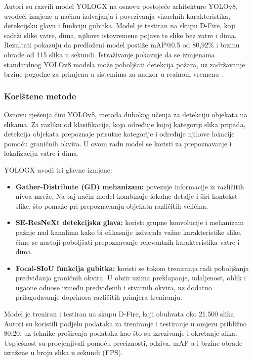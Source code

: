 Autori su razvili model YOLOGX na osnovu postojeće arhitekture YOLOv8, uvodeći izmjene u načinu izdvajanja i povezivanja vizuelnih karakteristika, detekcijsku glavu i funkciju gubitka. Model je testiran na skupu D-Fire, koji sadrži slike vatre, dima, njihove istovremene pojave te slike bez vatre i dima. Rezultati pokazuju da predloženi model postiže mAP@0.5 od 80,92\% i brzinu obrade od 115 slika u sekundi. Istraživanje pokazuje da se izmjenama standardnog YOLOv8 modela može poboljšati detekcija požara, uz zadržavanje brzine pogodne za primjenu u sistemima za nadzor u realnom vremenu \cite{liyologx}.

\subsubsection{Korištene metode}
Osnovu rješenja čini YOLOv8, metoda dubokog učenja za detekciju objekata na slikama. Za razliku od klasifikacije, koja određuje kojoj kategoriji slika pripada, detekcija objekata prepoznaje prisutne kategorije i određuje njihove lokacije pomoću graničnih okvira. U ovom radu model se koristi za prepoznavanje i lokalizaciju vatre i dima.

YOLOGX uvodi tri glavne izmjene:
\begin{itemize}
  \item \textbf{Gather-Distribute (GD) mehanizam:} povezuje informacije iz različitih nivoa mreže. Na taj način model kombinuje lokalne detalje i širi kontekst slike, što pomaže pri prepoznavanju objekata različitih veličina.
  \item \textbf{SE-ResNeXt detekcijska glava:} koristi grupne konvolucije i mehanizam pažnje nad kanalima kako bi efikasnije izdvajala važne karakteristike slike, čime se nastoji poboljšati prepoznavanje relevantnih karakteristika vatre i dima.
  \item \textbf{Focal-SIoU funkcija gubitka:} koristi se tokom treniranja radi poboljšanja predviđanja graničnih okvira. U obzir uzima preklapanje, udaljenost, oblik i ugaone odnose između predviđenih i stvarnih okvira, uz dodatno prilagođavanje doprinosa različitih primjera treniranju.
\end{itemize}

Model je treniran i testiran na skupu D-Fire, koji obuhvata oko 21.500 slika. Autori su koristili podjelu podataka za treniranje i testiranje u omjeru približno 80:20, uz tehnike proširenja podataka kao što su izrezivanje i okretanje slika. Uspješnost su procjenjivali pomoću preciznosti, odziva, mAP-a i brzine obrade izražene u broju slika u sekundi (FPS).


